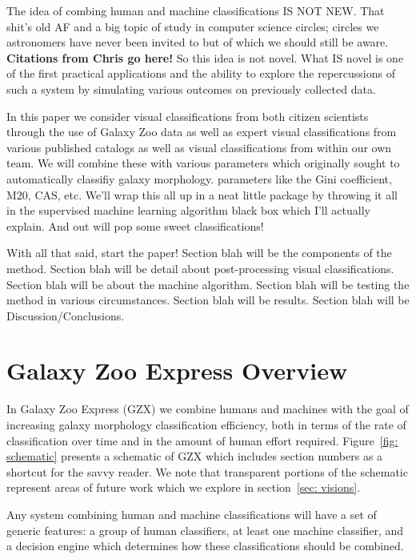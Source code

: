 \documentclass[twocolumn]{aastex6}
\begin{document}
The idea of combing human and machine classifications IS NOT NEW. That shit's
old AF and a big topic of study in computer science circles; circles we astronomers
have never been invited to but of which we should still be aware. \textbf{Citations
from Chris go here!} So this idea is not novel. What IS novel is one of the first practical
applications and the ability to explore the repercussions of such a system by 
simulating various outcomes on previously collected data. 


In this paper we consider visual classifications from both citizen scientists through
the use of Galaxy Zoo data as well as expert visual classifications from various 
published catalogs as well as visual classifications from within our own team. We 
will combine these with various parameters which originally sought to automatically
classifiy galaxy morphology. parameters like the Gini coefficient, M20, CAS, etc. 
We'll wrap this all up in a neat little package by throwing it all in the 
supervised machine learning algorithm black box which I'll actually explain.
And out will pop some sweet classifications! 

With all that said, start the paper! Section blah will be the components of the method. Section blah will be detail about post-processing visual classifications. Section blah will be about the machine algorithm. Section blah will be testing the method in various circumstances. Section blah will be results. Section blah will be Discussion/Conclusions. 





\section{Galaxy Zoo Express Overview}
In Galaxy Zoo Express (GZX) we combine humans and machines with the goal of 
increasing galaxy morphology classification efficiency, both in terms of the rate 
of classification over time and in the amount of human effort required. 
Figure~\ref{fig: schematic} presents a schematic of GZX which includes section 
numbers as a shortcut for the savvy reader. We note that transparent portions
 of the schematic represent areas of future work which we explore in section~\ref{sec: visions}. 

Any system combining human and machine classifications will have a set of generic 
features: a group of human classifiers, at least one machine classifier, and a 
decision engine which determines how these classifications should be combined.
\end{document}
